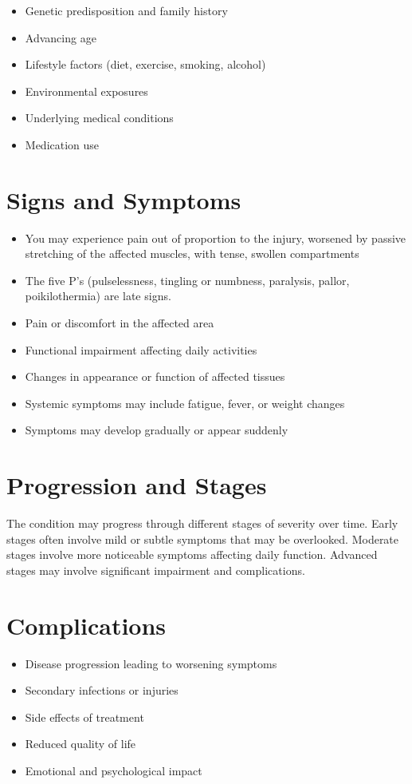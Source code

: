 \begin{itemize}[noitemsep]
  \item Genetic predisposition and family history
  \item Advancing age
  \item Lifestyle factors (diet, exercise, smoking, alcohol)
  \item Environmental exposures
  \item Underlying medical conditions
  \item Medication use
\end{itemize}
\section{Signs and Symptoms}
\begin{itemize}[noitemsep]
  \item You may experience pain out of proportion to the injury, worsened by passive stretching of the affected muscles, with tense, swollen compartments
  \item The five P's (pulselessness, tingling or numbness, paralysis, pallor, poikilothermia) are late signs.
  \item Pain or discomfort in the affected area
  \item Functional impairment affecting daily activities
  \item Changes in appearance or function of affected tissues
  \item Systemic symptoms may include fatigue, fever, or weight changes
  \item Symptoms may develop gradually or appear suddenly
\end{itemize}
\section{Progression and Stages}
The condition may progress through different stages of severity over time. Early stages often involve mild or subtle symptoms that may be overlooked. Moderate stages involve more noticeable symptoms affecting daily function. Advanced stages may involve significant impairment and complications.
\section{Complications}
\begin{itemize}[noitemsep]
  \item Disease progression leading to worsening symptoms
  \item Secondary infections or injuries
  \item Side effects of treatment
  \item Reduced quality of life
  \item Emotional and psychological impact
\end{itemize}
